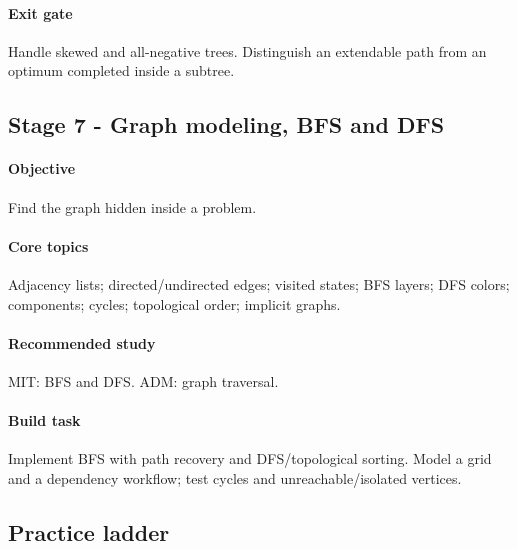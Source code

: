 \documentclass[11pt,letterpaper]{article}
\begin{document}
\paragraph*{Exit gate}

Handle skewed and all-negative trees. Distinguish an extendable path from an optimum completed inside a subtree.

\par{}
\begin{samepage}
\section{Stage 7 - Graph modeling, BFS and DFS}\label{sec:11}

\label{stage:7}


\paragraph*{Objective}

Find the graph hidden inside a problem.

\end{samepage}

\paragraph*{Core topics}

Adjacency lists; directed/undirected edges; visited states; BFS layers; DFS colors; components; cycles; topological order; implicit graphs.

\paragraph*{Recommended study}

MIT: BFS and DFS. ADM: graph traversal.

\paragraph*{Build task}

Implement BFS with path recovery and DFS/topological sorting. Model a grid and a dependency workflow; test cycles and unreachable/isolated vertices.

\subsection*{Practice ladder}
\end{document}
